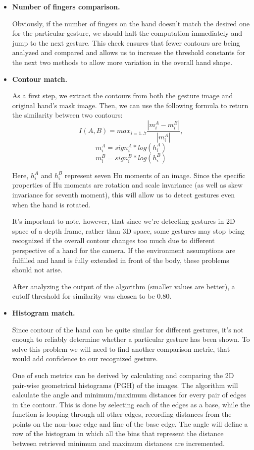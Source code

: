 \documentclass[a4paper,11pt,oneside]{article}
\begin{document}
\begin{itemize}
\item \textbf{Number of fingers comparison.}

Obviously, if the number of fingers on the hand doesn't match the desired one for the particular gesture, we should halt the computation immediately and jump to the next gesture. This check ensures that fewer contours are being analyzed and compared and allows us to increase the threshold constants for the next two methods to allow more variation in the overall hand shape.\\

\item \textbf{Contour match.}

As a first step, we extract the contours from both the gesture image and original hand's mask image. Then, we can use the following formula to return the similarity between two contours:
\[ I(A,B) = max_{i=1..7} \frac{|m_i^A - m_i^B|}{|m_i^A|}, \]
\[  m_i^A = sign_i^A * log (h_i^A) \]
\[  m_i^B = sign_i^B * log (h_i^B )\]

Here, $h_i^A$ and $h_i^B$ represent seven Hu moments \cite{ZH02} of an image. Since the specific properties of Hu moments are rotation and scale invariance (as well as skew invariance for seventh moment), this will allow us to detect gestures even when the hand is rotated.

It's important to note, however, that since we're detecting gestures in 2D space of a depth frame, rather than 3D space, some gestures may stop being recognized if the overall contour changes too much due to different perspective of a hand for the camera.  If the environment assumptions are fulfilled and hand is fully extended in front of the body, these problems should not arise.

After analyzing the output of the algorithm (smaller values are better), a cutoff threshold for similarity was chosen to be 0.80.\\

\item \textbf{Histogram match.}

Since contour of the hand can be quite similar for different gestures, it's not enough to reliably determine whether a particular gesture has been shown. To solve this problem we will need to find another comparison metric, that would add confidence to our recognized gesture.

One of such metrics can be derived by calculating and comparing the 2D pair-wise geometrical histograms (PGH) \cite{SC01} of the images. The algorithm will calculate the angle and minimum/maximum distances for every pair of edges in the contour. This is done by selecting each of the edges as a base, while the function is looping through all other edges, recording distances from the points on the non-base edge and line of the base edge. The angle will define a row of the histogram in which all the bins that represent the distance between retrieved minimum and maximum distances are incremented.


\end{itemize}
\end{document}
